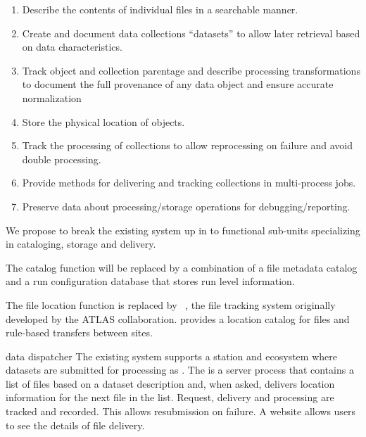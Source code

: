 \documentclass[../main-v1.tex]{subfiles}
\begin{document}
\begin{enumerate}

\item	Describe the contents of individual files in a searchable manner. 

\item	Create and document data collections ``datasets'' to allow later retrieval based on data characteristics.

 \item	Track object and collection parentage and describe processing transformations to document the full provenance of any data object and ensure accurate normalization


 \item	Store the physical  location of objects.

 \item	Track the processing of collections to allow reprocessing on failure and avoid double processing.

 \item	Provide methods for delivering and tracking collections in multi-process jobs.

 \item	Preserve data about processing/storage operations for debugging/reporting.

\end{enumerate}
 We propose to break the existing system up in to functional sub-units specializing in cataloging, storage and delivery. 

\begin{description}
\item{}  The catalog function will be replaced by a combination of a file metadata catalog  and a run configuration database that stores run level information.
\item{}  The file location function is replaced by ~\cite{Barisits:2019fyl}, the file tracking system originally developed by the ATLAS collaboration.  provides a location catalog for files and rule-based transfers between sites. 
\item{data dispatcher} The existing system supports a station and  ecosystem where datasets are submitted for processing as .  The  is a server process that contains a list of files based on a dataset description  and, when asked, delivers location information for the next file in the list.  Request, delivery and processing are tracked and recorded. This allows resubmission on failure. A website allows users to see the details of file delivery. 
\item{} 

\end{description}
\end{document}
